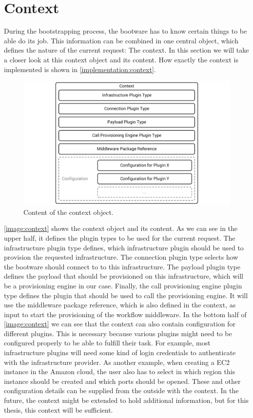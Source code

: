 \section{Context}
\label{design:context}

During the bootstrapping process, the bootware has to know certain things to be able do its job.
This information can be combined in one central object, which defines the nature of the current request: The context.
In this section we will take a closer look at this context object and its content.
How exactly the context is implemented is shown in \autoref{implementation:context}.

\begin{figure}[!htbp]
	\centering
	\includegraphics[resolution=600]{design/assets/context}
	\caption{Content of the context object.}
	\label{image:context}
\end{figure}

\autoref{image:context} shows the context object and its content.
As we can see in the upper half, it defines the plugin types to be used for the current request.
The infrastructure plugin type defines, which infrastructure plugin should be used to provision the requested infrastructure.
The connection plugin type selects how the bootware should connect to to this infrastructure.
The payload plugin type defines the payload that should be provisioned on this infrastructure, which will be a provisioning engine in our case.
Finally, the call provisioning engine plugin type defines the plugin that should be used to call the provisioning engine.
It will use the middleware package reference, which is also defined in the context, as input to start the provisioning of the workflow middleware.
In the bottom half of \autoref{image:context} we can see that the context can also contain configuration for different plugins.
This is necessary because various plugins might need to be configured properly to be able to fulfill their task.
For example, most infrastructure plugins will need some kind of login credentials to authenticate with the infrastructure provider.
As another example, when creating a EC2 instance in the Amazon cloud, the user also has to select in which region this instance should be created and which ports should be opened.
These and other configuration details can be supplied from the outside with the context.
In the future, the context might be extended to hold additional information, but for this thesis, this context will be sufficient.

